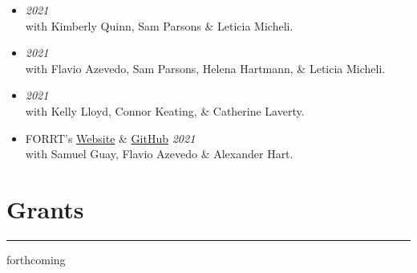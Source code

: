 \documentclass[letterpaper]{article}
\begin{document}
\begin{itemize}
\item[]{} \hfill {\em 2021} \\
with Kimberly Quinn, Sam Parsons \& Leticia Micheli.

\item[]{} \hfill {\em 2021} \\
with Flavio Azevedo, Sam Parsons, Helena Hartmann, \& Leticia Micheli.

\item[]{} \hfill {\em 2021} \\
with Kelly Lloyd, Connor Keating, \& Catherine Laverty.

\item[]{} FORRT's \href{https://forrt.org}{{\color{BlueViolet}Website}} \& \href{https://github.com/forrtproject/forrtproject.github.io}{{\color{BlueViolet}GitHub}} \hfill {\em 2021} \\
with Samuel Guay, Flavio Azevedo \& Alexander Hart.

\end{itemize}









\section*{\color{Brown}Grants}
\vspace{-.5em}
\hrule
\vspace{1em}
\begin{itemize}
\begin{center}
    \large \color{Gray}
\vspace{-0.5em}
\item
\hspace{-1.5em}forthcoming
\end{center}
\end{itemize}
\end{document}
